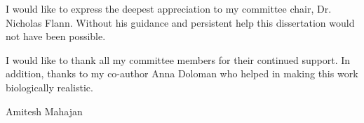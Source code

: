 %
%
%
%
%

\begin{acknowledgments} 
I would like to express the deepest appreciation to my committee chair, Dr. Nicholas Flann. Without his guidance and persistent help this dissertation would not have been possible.

I would like to thank all my committee members for their continued support. In addition, thanks to my co-author Anna Doloman who helped in making this work biologically realistic.
\\
\begin{flushright} 
Amitesh Mahajan 
\end{flushright}
\end{acknowledgments}

